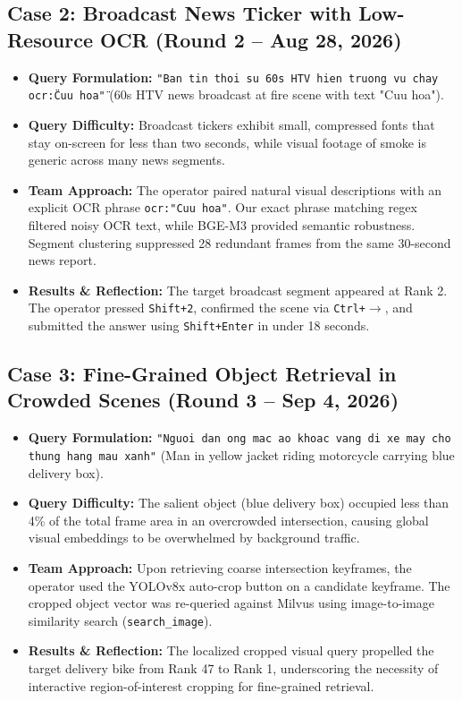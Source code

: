 \documentclass[10pt,a4paper,twocolumn]{article}
\begin{document}
\subsection{Case 2: Broadcast News Ticker with Low-Resource OCR (Round 2 -- Aug 28, 2026)}
\begin{itemize}
    \item \textbf{Query Formulation:} \texttt{"Ban tin thoi su 60s HTV hien truong vu chay ocr:\"Cuu hoa\""} (60s HTV news broadcast at fire scene with text "Cuu hoa").
    \item \textbf{Query Difficulty:} Broadcast tickers exhibit small, compressed fonts that stay on-screen for less than two seconds, while visual footage of smoke is generic across many news segments.
    \item \textbf{Team Approach:} The operator paired natural visual descriptions with an explicit OCR phrase \texttt{ocr:"Cuu hoa"}. Our exact phrase matching regex filtered noisy OCR text, while BGE-M3 provided semantic robustness. Segment clustering suppressed 28 redundant frames from the same 30-second news report.
    \item \textbf{Results \& Reflection:} The target broadcast segment appeared at Rank 2. The operator pressed \texttt{Shift+2}, confirmed the scene via \texttt{Ctrl+$\rightarrow$}, and submitted the answer using \texttt{Shift+Enter} in under 18 seconds.
\end{itemize}

\subsection{Case 3: Fine-Grained Object Retrieval in Crowded Scenes (Round 3 -- Sep 4, 2026)}
\begin{itemize}
    \item \textbf{Query Formulation:} \texttt{"Nguoi dan ong mac ao khoac vang di xe may cho thung hang mau xanh"} (Man in yellow jacket riding motorcycle carrying blue delivery box).
    \item \textbf{Query Difficulty:} The salient object (blue delivery box) occupied less than 4\% of the total frame area in an overcrowded intersection, causing global visual embeddings to be overwhelmed by background traffic.
    \item \textbf{Team Approach:} Upon retrieving coarse intersection keyframes, the operator used the YOLOv8x auto-crop button on a candidate keyframe. The cropped object vector was re-queried against Milvus using image-to-image similarity search (\texttt{search\_image}).
    \item \textbf{Results \& Reflection:} The localized cropped visual query propelled the target delivery bike from Rank 47 to Rank 1, underscoring the necessity of interactive region-of-interest cropping for fine-grained retrieval.
\end{itemize}
\end{document}
